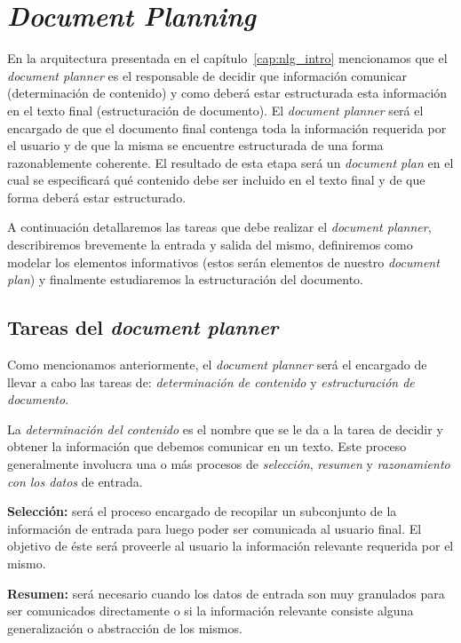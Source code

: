 \chapter{\textit{Document Planning}}
\label{cap:document_planning}

En la arquitectura presentada en el capítulo~\ref{cap:nlg_intro} mencionamos que el \emph{document planner} es el responsable de decidir que información comunicar (determinación de contenido) y como deberá estar estructurada esta información en el texto final (estructuración de documento). El \textit{document planner} será el encargado de que el documento final contenga toda la información requerida por el usuario y de que la misma se encuentre estructurada de una forma razonablemente coherente. El resultado de esta etapa será un \emph{document plan} en el cual se especificará qué contenido debe ser incluido en el texto final y de que forma deberá estar estructurado.


A continuación detallaremos las tareas que debe realizar el \textit{document planner}, describiremos brevemente la entrada y salida del mismo, definiremos como modelar los elementos informativos (estos serán elementos de nuestro \emph{document plan}) y finalmente estudiaremos la estructuración del documento.


\section{Tareas del \textit{document planner}}
Como mencionamos anteriormente, el \textit{document planner} será el encargado de llevar a cabo las tareas de: \emph{determinación de contenido} y \emph{estructuración de documento}.

La \emph{determinación del contenido} es el nombre que se le da a la tarea de decidir y obtener la información que debemos comunicar en un texto. Este proceso generalmente involucra una o más procesos de \emph{selección}, \emph{resumen} y \emph{razonamiento con los datos} de entrada.

\bigskip
\noindent
\textbf{Selección:} será el proceso encargado de recopilar un subconjunto de la información de entrada para luego poder ser comunicada al usuario final. El objetivo de éste será proveerle al usuario la información relevante requerida por el mismo.

\bigskip
\noindent
\textbf{Resumen:} será necesario cuando los datos de entrada son muy granulados para ser comunicados directamente o si la información relevante consiste alguna generalización o abstracción de los mismos.

